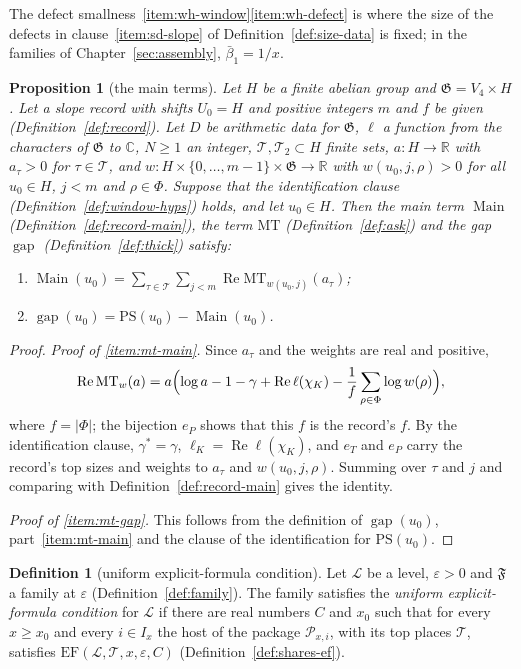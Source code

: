 \documentclass[11pt]{amsbook}
\theoremstyle{plain}
\newtheorem{proposition}[theorem]{Proposition}
\theoremstyle{definition}
\newtheorem{definition}[theorem]{Definition}
\theoremstyle{remark}
\numberwithin{equation}{section}
\numberwithin{figure}{chapter}
\numberwithin{table}{chapter}
\newcommand{\R}{\mathbb{R}}
\renewcommand{\C}{\mathbb{C}}
\newcommand{\eps}{\varepsilon}
\newcommand{\lev}{\mathscr{L}}
\newcommand{\GG}{\mathfrak{G}}
\newcommand{\PS}{\mathrm{PS}}
\newcommand{\MT}{\mathrm{MT}}
\newcommand{\Top}{\mathcal{T}}
\newcommand{\gap}{\operatorname{gap}}
\newcommand{\Main}{\operatorname{Main}}
\newcommand{\Fam}{\mathfrak{F}}
\begin{document}
\noindent The defect
smallness~\ref{item:wh-window}\ref{item:wh-defect} is
where the size of the defects in clause~\ref{item:sd-slope} of
Definition~\ref{def:size-data} is fixed; in the families of
Chapter~\ref{sec:assembly}, $\bar\beta_1=1/x$.

\begin{proposition}[the main terms]\label{prop:main-terms}
Let $H$ be a finite abelian group and $\GG=V_4\times H$. Let a slope
record with shifts $U_0=H$ and positive integers $m$ and $f$ be given
(Definition~\ref{def:record}). Let $D$ be arithmetic data for $\GG$,
$\ell$ a function from the characters of $\GG$ to $\C$, $N\ge1$ an
integer, $\Top,\Top_2\subset H$ finite sets, $a\colon H\to\R$ with
$a_\tau>0$ for $\tau\in\Top$, and
$w\colon H\times\{0,\dots,m-1\}\times\GG\to\R$ with
$w(u_0,j,\rho)>0$ for all $u_0\in H$, $j<m$ and $\rho\in\Phi$.
Suppose that the identification clause
(Definition~\ref{def:window-hyps}) holds, and let $u_0\in H$. Then the
main term $\Main$ (Definition~\ref{def:record-main}), the term $\MT$
(Definition~\ref{def:ask}) and the gap $\gap$
(Definition~\ref{def:thick}) satisfy:
\begin{enumerate}[label=(\alph*)]
\item\label{item:mt-main} $\displaystyle\Main(u_0)=\sum_{\tau\in\Top}
\sum_{j<m}\operatorname{Re}\MT_{w(u_0,j)}(a_\tau)$;
\item\label{item:mt-gap} $\gap(u_0)=\PS(u_0)-\Main(u_0)$.
\end{enumerate}
\end{proposition}

\begin{proof}
\noindent\emph{Proof of \ref{item:mt-main}.} Since $a_\tau$ and the weights are
real and positive,
\[
\operatorname{Re}\MT_w(a)=a\Bigl(\log a-1-\gamma+\operatorname{Re}
\ell(\chi_K)-\frac1f\sum_{\rho\in\Phi}\log w(\rho)\Bigr),
\]
where $f=|\Phi|$; the bijection $e_P$ shows that this $f$ is the
record's $f$. By the identification clause, $\gamma^*=\gamma$,
$\ell_K=\operatorname{Re}\ell(\chi_K)$, and $e_T$ and $e_P$ carry the
record's top sizes and weights to $a_\tau$ and $w(u_0,j,\rho)$.
Summing over $\tau$ and $j$ and comparing with
Definition~\ref{def:record-main} gives the identity.

\noindent\emph{Proof of \ref{item:mt-gap}.} This follows from the
definition of $\gap(u_0)$, part~\ref{item:mt-main} and the clause of
the identification for $\PS(u_0)$.
\end{proof}

\begin{definition}[uniform explicit-formula condition]
\label{def:uniform-ef}
Let $\lev$ be a level, $\eps>0$ and $\Fam$ a family at $\eps$
(Definition~\ref{def:family}). The family satisfies the \emph{uniform
explicit-formula condition} for $\lev$ if there are real numbers $C$
and $x_0$ such that for every $x\ge x_0$ and every $i\in I_x$ the host
of the package $\mathcal P_{x,i}$, with its top places $\Top$,
satisfies $\mathrm{EF}(\lev,\Top,x,\eps,C)$
(Definition~\ref{def:shares-ef}).
\end{definition}
\end{document}
